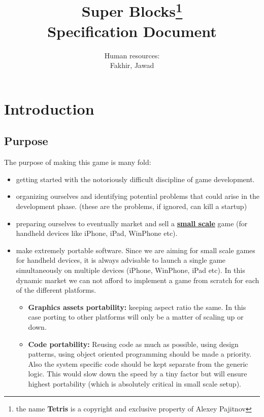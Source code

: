 \documentclass[10pt]{report}
\theoremstyle{definition}
\theoremstyle{remark}
\begin{document}

\title{\textbf{Super Blocks\footnote{the name \textbf{Tetris} is a copyright and exclusive property of Alexey Pajitnov}} \\ {\small Specification Document}}
\author{\footnotesize Human resources: \\ \scriptsize {Fakhir, Jawad}}
\maketitle

\tableofcontents

\listoffigures

\chapter{Introduction}
\section{Purpose}
The purpose of making this game is many fold:
\begin{itemize}
\item getting started with the notoriously difficult discipline of game development.
\item organizing ourselves and identifying potential problems that could arise in the development phase. (these are the problems, if ignored, can kill a startup)
\item preparing ourselves to eventually market and sell a \textbf{\underline{small scale}} game (for handheld devices like iPhone, iPad, WinPhone etc).
\item make extremely portable software. Since we are aiming for small scale games for handheld devices, it is always advisable to launch a single game simultaneously on multiple devices (iPhone, WinPhone, iPad etc). In this dynamic market we can not afford to implement a game from scratch for each of the different platforms.
    \begin{itemize}
    \item \textbf{Graphics assets portability:} keeping aspect ratio the same. In this case porting to other platforms will only be a matter of scaling up or down.
    \item \textbf{Code portability:} Reusing code as much as possible, using design patterns, using object oriented programming should be made a priority. Also the system specific code should be kept separate from the generic logic. This would slow down the speed by a tiny factor but will ensure highest portability (which is absolutely critical in small scale setup).
    \end{itemize}
\end{itemize}
\end{document}
